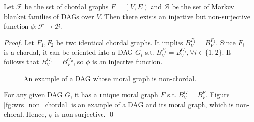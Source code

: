 \begin{proposition}
Let $\mathcal{F}$ be the set of chordal graphs $F=(V,E)$ and $\mathcal{B}$ be the set of Markov blanket families of DAGs over $V$. Then there exists an injective but non-surjective function $\phi: \mathcal{F} \rightarrow \mathcal{B}$. 
\end{proposition}
\begin{proof}
Let $F_1, F_2$ be two identical chordal graphs. It implies $B_V^{F_1} = B_V^{F_2}$. Since $F_i$ is a chordal, it can be oriented into a DAG $G_i$ s.t. $B_V^{F_i} = B_V^{G_i}, \forall i \in \{1,2\}$. It follows that $B_V^{G_1}=B_V^{G_2}$, so $\phi$ is an injective function. 
\begin{figure}[H]
\centering
{}
\caption{An example of a DAG whose moral graph is non-chordal.}
\end{figure}
For any given DAG $G$, it has a unique moral graph $F$ s.t. $B_V^G=B_V^F$. Figure \ref{fg:wrs_non_chordal} is an example of a DAG and its moral graph, which is non-choral. Hence, $\phi$ is non-surjective. \qed
\end{proof}



